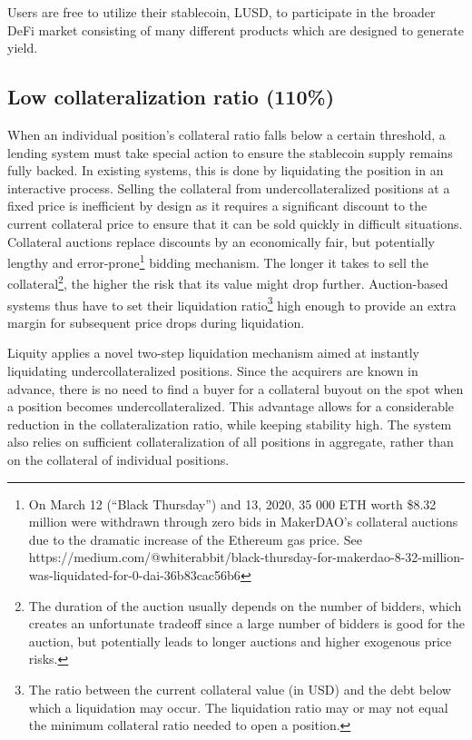 \documentclass{article}
\begin{document}
Users are free to utilize their stablecoin, LUSD, to participate in the broader DeFi market consisting of many different products which are designed to generate yield.

\subsection{Low collateralization ratio (110\%)}
When an individual position’s collateral ratio falls below a certain threshold, a lending system must take special action to ensure the stablecoin supply remains fully backed. In existing systems, this is done by liquidating the position in an interactive process. Selling the collateral from undercollateralized positions at a fixed price is inefficient by design as it requires a significant discount to the current collateral price to ensure that it can be sold quickly in difficult situations. Collateral auctions replace discounts by an economically fair, but potentially lengthy and error-prone\footnote{On March 12 (“Black Thursday”) and 13, 2020, 35 000 ETH worth \$8.32 million were withdrawn through zero bids in MakerDAO’s collateral auctions due to the dramatic increase of the Ethereum gas price. See https://medium.com/@whiterabbit/black-thursday-for-makerdao-8-32-million-was-liquidated-for-0-dai-36b83cac56b6} bidding mechanism. The longer it takes to sell the collateral\footnote{The duration of the auction usually depends on the number of bidders, which creates an unfortunate tradeoff since a large number of bidders is good for the auction, but potentially leads to longer auctions and higher exogenous price risks.}, the higher the risk that its value might drop further. Auction-based systems thus have to set their liquidation ratio\footnote{The ratio between the current collateral value (in USD) and the debt below which a liquidation may occur. The liquidation ratio may or may not equal the minimum collateral ratio needed to open a position.} high enough to provide an extra margin for subsequent price drops during liquidation.

Liquity applies a novel two-step liquidation mechanism aimed at instantly liquidating undercollateralized positions. Since the acquirers are known in advance, there is no need to find a buyer for a collateral buyout on the spot when a position becomes undercollateralized. This advantage allows for a considerable reduction in the collateralization ratio, while keeping stability high. The system also relies on sufficient collateralization of all positions in aggregate, rather than on the collateral of individual positions.
\end{document}
